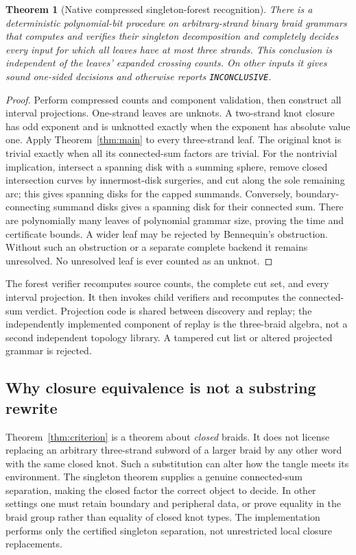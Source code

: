\documentclass[11pt,letterpaper]{article}
\newtheorem{theorem}{Theorem}[section]
\theoremstyle{definition}\newtheorem{definition}[theorem]{Definition}
\theoremstyle{remark}\newtheorem{remark}[theorem]{Remark}
\begin{document}
\begin{theorem}[Native compressed singleton-forest recognition]\label{thm:forest}
There is a deterministic polynomial-bit procedure on arbitrary-strand binary braid grammars that computes and verifies their singleton decomposition and completely decides every input for which all leaves have at most three strands. This conclusion is independent of the leaves' expanded crossing counts. On other inputs it gives sound one-sided decisions and otherwise reports \texttt{INCONCLUSIVE}.
\end{theorem}
\begin{proof}
Perform compressed counts and component validation, then construct all interval projections. One-strand leaves are unknots. A two-strand knot closure has odd exponent and is unknotted exactly when the exponent has absolute value one. Apply Theorem~\ref{thm:main} to every three-strand leaf. The original knot is trivial exactly when all its connected-sum factors are trivial. For the nontrivial implication, intersect a spanning disk with a summing sphere, remove closed intersection curves by innermost-disk surgeries, and cut along the sole remaining arc; this gives spanning disks for the capped summands. Conversely, boundary-connecting summand disks gives a spanning disk for their connected sum. There are polynomially many leaves of polynomial grammar size, proving the time and certificate bounds. A wider leaf may be rejected by Bennequin's obstruction. Without such an obstruction or a separate complete backend it remains unresolved. No unresolved leaf is ever counted as an unknot.
\end{proof}

The forest verifier recomputes source counts, the complete cut set, and every interval projection. It then invokes child verifiers and recomputes the connected-sum verdict. Projection code is shared between discovery and replay; the independently implemented component of replay is the three-braid algebra, not a second independent topology library. A tampered cut list or altered projected grammar is rejected.

\subsection{Why closure equivalence is not a substring rewrite}
Theorem~\ref{thm:criterion} is a theorem about \emph{closed} braids. It does not license replacing an arbitrary three-strand subword of a larger braid by any other word with the same closed knot. Such a substitution can alter how the tangle meets its environment. The singleton theorem supplies a genuine connected-sum separation, making the closed factor the correct object to decide. In other settings one must retain boundary and peripheral data, or prove equality in the braid group rather than equality of closed knot types. The implementation performs only the certified singleton separation, not unrestricted local closure replacements.
\end{document}
